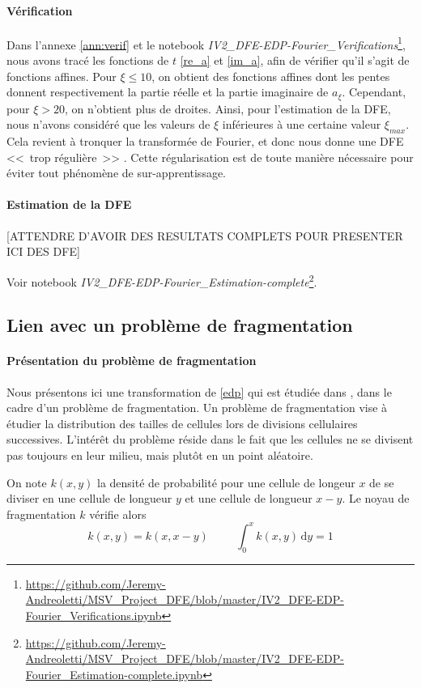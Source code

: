 \documentclass[12pt]{article}
\newcommand{\esp}{\hspace{1cm}}
\newcommand{\de}{\,\mathrm{d}}
\begin{document}
\paragraph{Vérification} Dans l'annexe \ref{ann:verif} et le notebook \emph{IV2\_DFE-EDP-Fourier\_Verifications}\footnote{\url{https://github.com/Jeremy-Andreoletti/MSV_Project_DFE/blob/master/IV2_DFE-EDP-Fourier_Verifications.ipynb}}, nous avons tracé les fonctions de $t$ \eqref{re_a} et \eqref{im_a}, afin de vérifier qu'il s'agit de fonctions affines. Pour $\xi\leqslant 10$, on obtient des fonctions affines dont les pentes donnent respectivement la partie réelle et la partie imaginaire de $a_{\xi}$. Cependant, pour $\xi>20$, on n'obtient plus de droites. Ainsi, pour l'estimation de la DFE, nous n'avons considéré que les valeurs de $\xi$ inférieures à une certaine valeur $\xi_{max}$. Cela revient à tronquer la transformée de Fourier, et donc nous donne une DFE <<~trop régulière~>> . Cette régularisation est de toute manière nécessaire pour éviter tout phénomène de sur-apprentissage.

\paragraph{Estimation de la DFE}

[ATTENDRE D'AVOIR DES RESULTATS COMPLETS POUR PRESENTER ICI DES DFE]

Voir notebook \emph{IV2\_DFE-EDP-Fourier\_Estimation-complete}\footnote{\url{https://github.com/Jeremy-Andreoletti/MSV_Project_DFE/blob/master/IV2_DFE-EDP-Fourier_Estimation-complete.ipynb}}.

\subsection{Lien avec un problème de fragmentation}

\paragraph{Présentation du problème de fragmentation}
Nous présentons ici une transformation de \eqref{edp} qui est étudiée dans \cite{md1}, \cite{md2} dans le cadre d'un problème de fragmentation. Un problème de fragmentation vise à étudier la distribution des tailles de cellules lors de divisions cellulaires successives. L'intérêt du problème réside dans le fait que les cellules ne se divisent pas toujours en leur milieu, mais plutôt en un point aléatoire.

On note $k(x,y)$ la densité de probabilité pour une cellule de longeur $x$ de se diviser en une cellule de longueur $y$ et une cellule de longueur $x-y$. Le noyau de fragmentation $k$ vérifie alors \[k(x,y)=k(x,x-y)\esp \int_0^xk(x,y)\de y=1\]
\end{document}
